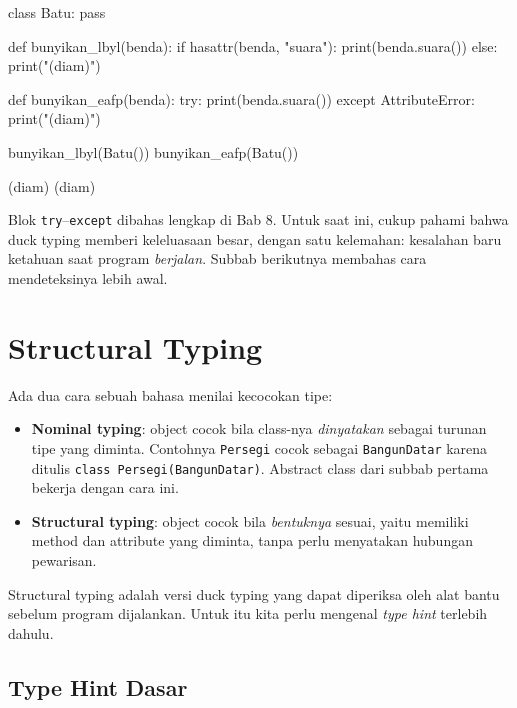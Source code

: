 \begin{kode}
class Batu:
    pass

def bunyikan_lbyl(benda):
    if hasattr(benda, "suara"):
        print(benda.suara())
    else:
        print("(diam)")

def bunyikan_eafp(benda):
    try:
        print(benda.suara())
    except AttributeError:
        print("(diam)")

bunyikan_lbyl(Batu())
bunyikan_eafp(Batu())
\end{kode}

\begin{keluaran}
(diam)
(diam)
\end{keluaran}

Blok \texttt{try}--\texttt{except} dibahas lengkap di Bab 8. Untuk saat ini, cukup pahami bahwa duck typing memberi keleluasaan besar, dengan satu kelemahan: kesalahan baru ketahuan saat program \emph{berjalan}. Subbab berikutnya membahas cara mendeteksinya lebih awal.

\section{Structural Typing}

Ada dua cara sebuah bahasa menilai kecocokan tipe:

\begin{itemize}
  \item \textbf{Nominal typing}: object cocok bila class-nya \emph{dinyatakan} sebagai turunan tipe yang diminta. Contohnya \texttt{Persegi} cocok sebagai \texttt{BangunDatar} karena ditulis \texttt{class Persegi(BangunDatar)}. Abstract class dari subbab pertama bekerja dengan cara ini.
  \item \textbf{Structural typing}: object cocok bila \emph{bentuknya} sesuai, yaitu memiliki method dan attribute yang diminta, tanpa perlu menyatakan hubungan pewarisan.
\end{itemize}

Structural typing adalah versi duck typing yang dapat diperiksa oleh alat bantu sebelum program dijalankan. Untuk itu kita perlu mengenal \emph{type hint} terlebih dahulu.

\subsection{Type Hint Dasar}

